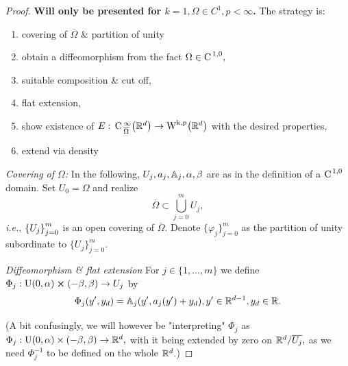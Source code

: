 \documentclass{article}
\begin{document}
\begin{proof}
	\textbf{Will only be presented for $k=1, \Omega \in C^1, p < \infty$.} The strategy is:
	\begin{enumerate}
		\item covering of $\overline{\Omega}$ \& partition of unity
		\item obtain a diffeomorphism from the fact $\Omega \in \text{C}^{\!\,\, 1,0},$
		\item suitable composition \& cut off,
		\item flat extension,
		\item show existence of $E: \, \text{C} \,^{\infty}_{\overline{\Omega}}\qty(\R^{d})\to \WkpSet{\R^{d}}$ with the desired properties,
		\item extend via density
	\end{enumerate}

	\textit{Covering of $\Omega$:}
	In the following,  $U_j,a_j, \mathbb{A}_j, \alpha, \beta$ are as in the definition of a $\text{C}^{\!\,\, 1,0}$ domain. Set $U_0 = \Omega$ and realize
	\[
		\overline{\Omega} \subset \bigcup_{j=0}^m U_j,
	\]
	\textit{i.e.}, $\qty{U_j}_{j=0}^m$ is an open covering of $\overline{\Omega}$. Denote $\{\varphi_j \}_{j=0}^m$ as the partition of unity subordinate to $\{U_j\}_{j=0}^m.$


	\textit{Diffeomorphism \& flat extension}
	For $j \in \{1, \dots, m\}$ we define $\Phi_j : \text{U}(0,\alpha) \cross (-\beta,\beta) \to U_j$ by
	\[
		\Phi_j\qty(y',y_d) = \mathbb{A}_j (y', a_j(y') + y_d), y' \in {\mathbb R}^{d-1}, y_d \in {\mathbb R}.
	\]

	(A bit confusingly, we will however be "interpreting" $\Phi_j$ as $\Phi_j : \text{U}(0,\alpha) \times \qty(-\beta, \beta) \to {\mathbb R}^{d},$ with it being extended by zero on ${\mathbb R}^{d}/ \overline{U_j},$ as we need $\Phi_j^{-1}$ to be defined on the whole ${\mathbb R}^{d}.$)


\end{proof}
\end{document}
